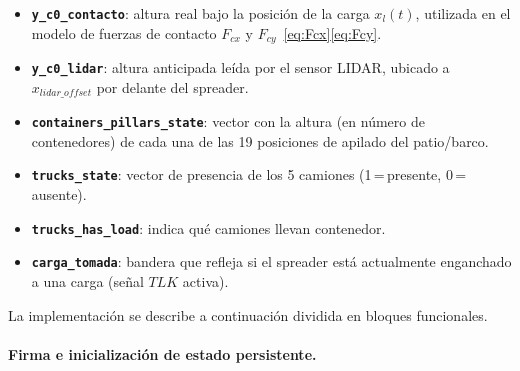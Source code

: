 \documentclass[12pt, a4paper]{article}
\begin{document}
\begin{itemize}
    \item \textbf{\texttt{y\_c0\_contacto}}: altura real bajo la posición de la carga
    $x_l(t)$, utilizada en el modelo de fuerzas de contacto
    $F_{cx}$ y $F_{cy}$~\eqref{eq:Fcx}\eqref{eq:Fcy}.
    \item \textbf{\texttt{y\_c0\_lidar}}: altura anticipada leída por el sensor LIDAR,
    ubicado a $x_{lidar\_offset}$ por delante del spreader.
    \item \textbf{\texttt{containers\_pillars\_state}}: vector con la altura (en número de
    contenedores) de cada una de las 19 posiciones de apilado del patio/barco.
    \item \textbf{\texttt{trucks\_state}}: vector de presencia de los 5 camiones
    (1\,=\,presente, 0\,=\,ausente).
    \item \textbf{\texttt{trucks\_has\_load}}: indica qué camiones llevan contenedor.
    \item \textbf{\texttt{carga\_tomada}}: bandera que refleja si el spreader está
    actualmente enganchado a una carga (señal $TLK$ activa).
\end{itemize}

La implementación se describe a continuación dividida en bloques funcionales.

\paragraph{Firma e inicialización de estado persistente.}\leavevmode
\end{document}
